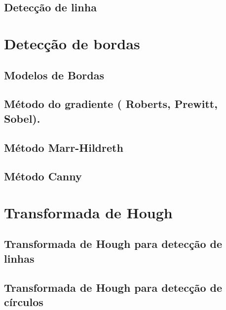 \documentclass[
  brazilian,
]{book}
\begin{document}
\hypertarget{detecuxe7uxe3o-de-linha}{%
\subsection{Detecção de linha}\label{detecuxe7uxe3o-de-linha}}

\hypertarget{detecuxe7uxe3o-de-bordas}{%
\section{Detecção de bordas}\label{detecuxe7uxe3o-de-bordas}}

\hypertarget{modelos-de-bordas}{%
\subsection{Modelos de Bordas}\label{modelos-de-bordas}}

\hypertarget{muxe9todo-do-gradiente-roberts-prewitt-sobel.}{%
\subsection{Método do gradiente ( Roberts, Prewitt, Sobel).}\label{muxe9todo-do-gradiente-roberts-prewitt-sobel.}}

\hypertarget{muxe9todo-marr-hildreth}{%
\subsection{Método Marr-Hildreth}\label{muxe9todo-marr-hildreth}}

\hypertarget{muxe9todo-canny}{%
\subsection{Método Canny}\label{muxe9todo-canny}}

\hypertarget{transformada-de-hough}{%
\section{Transformada de Hough}\label{transformada-de-hough}}

\hypertarget{transformada-de-hough-para-detecuxe7uxe3o-de-linhas}{%
\subsection{Transformada de Hough para detecção de linhas}\label{transformada-de-hough-para-detecuxe7uxe3o-de-linhas}}

\hypertarget{transformada-de-hough-para-detecuxe7uxe3o-de-cuxedrculos}{%
\subsection{Transformada de Hough para detecção de círculos}\label{transformada-de-hough-para-detecuxe7uxe3o-de-cuxedrculos}}
\end{document}
